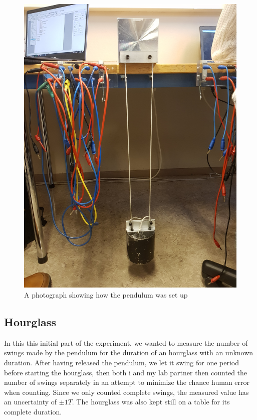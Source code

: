 \documentclass[%
 reprint,
 amsmath,amssymb,
 aps,
]{revtex4-1}
\begin{document}
    \begin{figure}
        \center
        \includegraphics[scale=0.06, angle=270]{experiment1.jpg}
        \caption{A photograph showing how the pendulum was set up}
        \label{fig:pendulum1}
    \end{figure}

    \subsection{\label{subsec:exp_hourglass}Hourglass}
        In this this initial part of the experiment, we wanted to measure the number of swings made by the pendulum for the duration of an hourglass with an unknown duration. After having released the pendulum, we let it swing for one period before starting the hourglass, then both i and my lab partner then counted the number of swings separately in an attempt to minimize the chance human error when counting. Since we only counted complete swings, the measured value has an uncertainty of $\pm 1T$. The hourglass was also kept still on a table for its complete duration.
    
\end{document}
